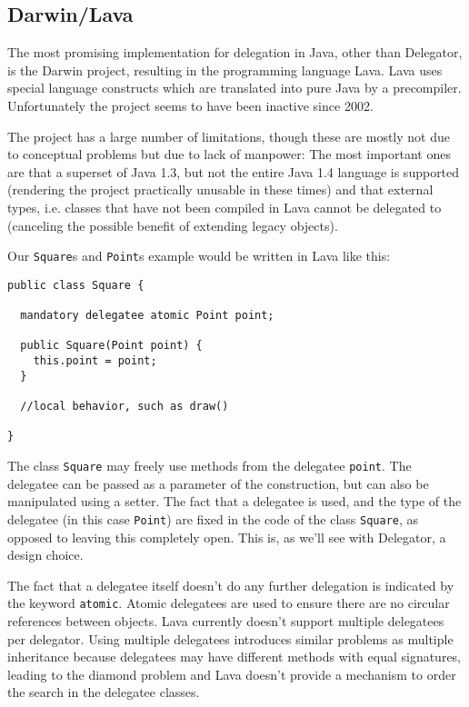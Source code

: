 \documentclass[a4paper,12pt]{book}
\begin{document}
\subsection*{Darwin/Lava}
The most promising implementation for delegation in Java, other than Delegator, is the Darwin project, resulting in the programming language Lava. Lava uses special language constructs which are translated into pure Java by a precompiler. Unfortunately the project seems to have been inactive since 2002.

The project has a large number of limitations, though these are mostly not due to conceptual problems but due to lack of manpower: The most important ones are that a superset of Java 1.3, but not the entire Java 1.4 language is supported (rendering the project practically unusable in these times) and that external types, i.e. classes that have not been compiled in Lava cannot be delegated to (canceling the possible benefit of extending legacy objects).

Our \verb|Square|s and \verb|Point|s example would be written in Lava like this:

\begin{verbatim}
public class Square {

  mandatory delegatee atomic Point point;

  public Square(Point point) {
    this.point = point;
  }

  //local behavior, such as draw()

}
\end{verbatim}

The class \verb|Square| may freely use methods from the delegatee \verb|point|. The delegatee can be passed as a parameter of the construction, but can also be manipulated using a setter. The fact that a delegatee is used, and the type of the delegatee (in this case \verb|Point|) are fixed in the code of the class \verb|Square|, as opposed to leaving this completely open. This is, as we'll see with Delegator, a design choice.

The fact that a delegatee itself doesn't do any further delegation is indicated by the keyword \verb|atomic|. Atomic delegatees are used to ensure there are no circular references between objects. Lava currently doesn't support multiple delegatees per delegator. Using multiple delegatees introduces similar problems as multiple inheritance because delegatees may have different methods with equal signatures, leading to the diamond problem and Lava doesn't provide a mechanism to order the search in the delegatee classes.
\end{document}
